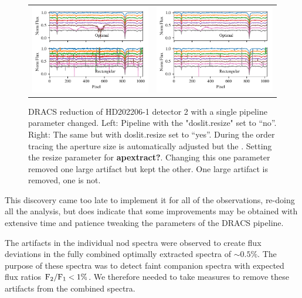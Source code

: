\begin{figure}
    \centering
    \begin{tabular}{cc}
    \includegraphics[width=0.5\linewidth]{figures/reduction/bp_plots/non_resized_nods_HD202206-1_chip_2} & \includegraphics[width=0.5\linewidth]{figures/reduction/bp_plots/resized_nods_HD202206-1_chip_2}\\
    \end{tabular}
    \caption{DRACS reduction of HD202206-1 detector 2 with a single pipeline parameter changed. Left: Pipeline with the "doslit.resize" set to ``no''. Right: The same but with doslit.resize set to ``yes''. During the order tracing the aperture size is automatically adjusted but the . Setting the resize parameter for \textbf{apextract?}. Changing this one parameter removed one large artifact but kept the other. One large artifact is removed, one is not.}
    \label{fig:resizednods}
\end{figure}

This discovery came too late to implement it for all of the observations, re-doing all the analysis, but does indicate that some improvements may be obtained with extensive time and patience tweaking the parameters of the DRACS pipeline.


The artifacts in the individual nod spectra were observed to create flux deviations in the fully combined optimally extracted spectra of \(\sim 0.5\% \). The purpose of these spectra was to detect faint companion spectra with expected flux ratios \(\rm {F_2}/{F_1} < 1\% \). We therefore needed to take measures to remove these artifacts from the combined spectra.


